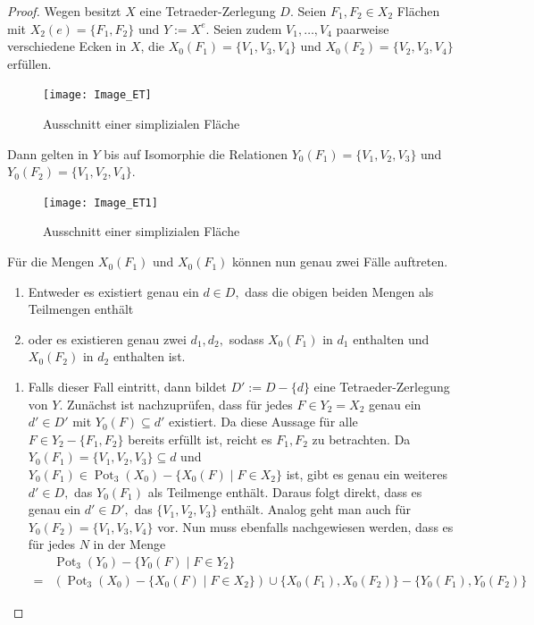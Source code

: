 \documentclass[12pt,titlepage,twoside,cleardoublepage]{article}
\theoremstyle{nummermitklammern}
\numberwithin{equation}{section}
\DeclareMathOperator{\Pot}{Pot}
\begin{document}
 \begin{proof}
 Wegen  besitzt $X$ eine Tetraeder-Zerlegung $D.$ Seien $F_1,F_2\in X_2$ Flächen mit $X_2(e)=\{F_1,F_2\}$ und $Y:=X^e.$ Seien zudem $V_1,\ldots,V_4$ paarweise verschiedene Ecken in $X$, die $X_0(F_1)=\{V_1,V_3,V_4\}$ und $X_0(F_2)=\{V_2,V_3,V_4\}$ erfüllen.
 \begin{figure}[H]
\begin{center}
\texttt{[image: Image\_ET]}
\end{center}
\caption{Ausschnitt einer simplizialen Fläche}
\end{figure}
 
 Dann gelten in $Y$ bis auf Isomorphie die Relationen ${Y}_0(F_1)=\{V_1,V_2,V_3\}$ und ${Y}_0(F_2)=\{V_1,V_2,V_4\}.$
 \begin{figure}[H]
\begin{center}
\texttt{[image: Image\_ET1]}
\end{center}
\caption{Ausschnitt einer simplizialen Fläche}
\end{figure}
Für die Mengen ${X}_0(F_1)$ und ${X}_0(F_1)$ können nun genau zwei Fälle auftreten.
\begin{enumerate}
\item Entweder es existiert genau ein $d\in D,$ dass die obigen beiden Mengen als Teilmengen enthält
\item oder es existieren genau zwei $d_1,d_2,$ sodass $X_0(F_1)$ in $d_1$ enthalten und $X_0(F_2)$ in $d_2$ enthalten ist.
\end{enumerate}
\begin{enumerate}
\item Falls dieser Fall eintritt, dann bildet $D':=D-\{d\}$ eine Tetraeder-Zerlegung von $Y.$ Zunächst ist nachzuprüfen, dass für jedes $F\in {Y}_2=X_2$ genau ein $d'\in D'$ mit ${Y}_0(F)\subseteq d'$ existiert. Da diese Aussage für alle $F\in Y_2-\{ F_1,F_2\}$ bereits erfüllt ist, reicht es $F_1,F_2$ zu betrachten. Da ${Y}_0(F_1)=\{V_1,V_2,V_3\}\subseteq d$ und  $Y_0(F_1) \in \Pot_3(X_0)-\{X_0(F)\mid F\in X_2\}$ ist, gibt es genau ein weiteres $d'\in D,$ das ${Y}_0(F_1)$ als Teilmenge enthält. Daraus folgt direkt, dass es genau ein $d'\in D',$ das $\{V_1,V_2,V_3\}$ enthält. Analog geht man auch für ${Y}_0(F_2)=\{V_1,V_3,V_4\}$ vor.
Nun muss ebenfalls nachgewiesen werden, dass es für jedes $N$ in der Menge 
\begin{align*}
 &\Pot_3({Y}_0)-\{{Y}_0(F)\mid F\in {Y}_2\}\\
 =& (\Pot_3({X}_0)-\{{X}_0(F)\mid F\in {X}_2\})\cup \{X_0(F_1),X_0(F_2)\}-\{{Y}_0(F_1),{Y}_0(F_2)\}

\end{align*}
\end{enumerate}
\end{proof}
\end{document}
